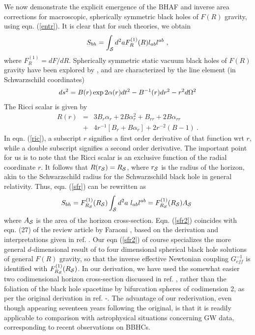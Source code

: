 \documentclass[11pt]{article}
\begin{document}
We now demonstrate the explicit emergence of the BHAF and inverse area corrections for  macroscopic, spherically symmetric black holes of $F(R)$ gravity, using eqn. (\ref{entr}). It is clear that for such theories, we obtain
\begin{eqnarray}
S_{bh} = \int_{\cal S} d^2a F^{(1)}_R(R) l_{ab} l^{ab}~, \label{sfr}
\end{eqnarray} 
where $F_R^{(1)} = dF/dR$. Spherically symmetric static vacuum black holes of $F(R)$ gravity have been explored by \cite{seb2011}, and are characterized by the line element (in Schwarzschild coordinates)
\begin{eqnarray}
ds^2 = B(r) \exp 2\alpha(r) dt^2 - B^{-1}(r) dr^2 - r^2 d\Omega^2 \label{{met}} 
\end{eqnarray}
The Ricci scalar is given by \cite{seb2011}
\begin{eqnarray}
R(r) &=& 3 B_r \alpha_r + 2B \alpha_r^2 + B_{rr} + 2B \alpha_{rr} \nonumber \\
&+& 4r^{-1} \left[B_r + B \alpha_r \right] + 2r^{-2} (B-1)~. \label{ric}   
\end{eqnarray}
In eqn. (\ref{ric}), a subscript $r$ signifies a first order derivative of that function wrt $r$, while a double subscript signifies a second order derivative. The important point for us is to note that the Ricci scalar is an exclusive function of the radial coordinate $r$. It follows that $R(r_{\cal S}) = R_{\cal S}$, where $r_{\cal S}$ is the radius of the horizon, akin to the Schwarzschild radius for the Schwarzschild black hole in general relativity. Thus, eqn. (\ref{sfr}) can be rewritten as 
\begin{eqnarray}
S_{bh} = F^{(1)}_{R_{\cal S}}(R_{\cal S}) \int_{\cal S} d^2a~ l_{ab} l^{ab} =  F^{(1)}_{R_{\cal S}} (R_{\cal S}) A_{\cal S} ~\label{sfr2}
\end{eqnarray}
where $A_{\cal S}$ is the area of the horizon cross-section. Eqn. (\ref{sfr2}) coincides with eqn. (27) of the review article by Faraoni \cite{far2010}, based on the derivation and interpretations given in ref. \cite{bru2009}. Our eqn (\ref{sfr2}) of course specializes the more general $d$-dimensional result of \cite{bru2009} to four dimensional spherical black hole solutions of general $F(R)$ gravity, so that the inverse effective Newtonian coupling $G_{eff}^{-1}$ is identified with $F^{(1)}_{R_{\cal S}} (R_{\cal S})$. In our derivation, we have used the somewhat easier two codimensional horizon cross-section discussed in ref. \cite{jkm1994}, rather than the foliation of the black hole spacetime by bifurcation spheres of codimension 2, as per the original derivation in ref. \cite{rmw1992}-\cite{iw1994}. The advantage of our rederivation, even though appearing seventeen years following the original, is that it is readily applicable to comparison with astrophysical situations concerning GW data, corresponding to recent observations on BBHCs.    
\end{document}
